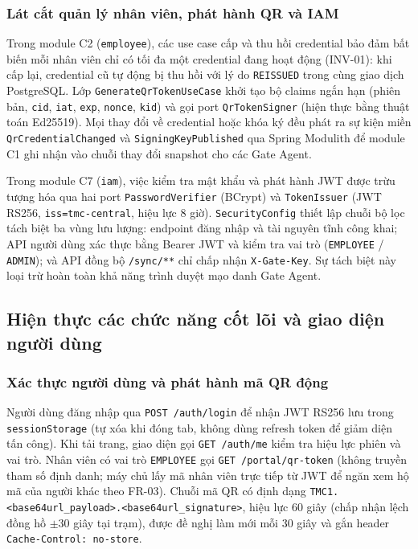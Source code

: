 \subsubsection{Lát cắt quản lý nhân viên, phát hành QR và IAM}

Trong module C2 (\texttt{employee}), các use case cấp và thu hồi credential bảo đảm bất biến mỗi nhân
viên chỉ có tối đa một credential đang hoạt động (INV-01): khi cấp lại, credential cũ tự động bị thu
hồi với lý do \texttt{REISSUED} trong cùng giao dịch PostgreSQL. Lớp
\texttt{GenerateQrTokenUseCase} khởi tạo bộ claims ngắn hạn (phiên bản, \texttt{cid}, \texttt{iat},
\texttt{exp}, \texttt{nonce}, \texttt{kid}) và gọi port \texttt{QrTokenSigner} (hiện thực bằng thuật
toán Ed25519). Mọi thay đổi về credential hoặc khóa ký đều phát ra sự kiện miền
\texttt{QrCredentialChanged} và \texttt{SigningKeyPublished} qua Spring Modulith để module C1 ghi nhận
vào chuỗi thay đổi snapshot cho các Gate Agent.

Trong module C7 (\texttt{iam}), việc kiểm tra mật khẩu và phát hành JWT được trừu tượng hóa qua hai
port \texttt{PasswordVerifier} (BCrypt) và \texttt{TokenIssuer} (JWT RS256, \texttt{iss=tmc-central},
hiệu lực 8 giờ). \texttt{SecurityConfig} thiết lập chuỗi bộ lọc tách biệt ba vùng lưu lượng: endpoint
đăng nhập và tài nguyên tĩnh công khai; API người dùng xác thực bằng Bearer JWT và kiểm tra vai trò
(\texttt{EMPLOYEE} / \texttt{ADMIN}); và API đồng bộ \texttt{/sync/**} chỉ chấp nhận
\texttt{X-Gate-Key}. Sự tách biệt này loại trừ hoàn toàn khả năng trình duyệt mạo danh Gate Agent.

\subsection{Hiện thực các chức năng cốt lõi và giao diện người dùng}\label{sec:core-function-implementation}

\subsubsection{Xác thực người dùng và phát hành mã QR động}

Người dùng đăng nhập qua \texttt{POST /auth/login} để nhận JWT RS256 lưu trong
\texttt{sessionStorage} (tự xóa khi đóng tab, không dùng refresh token để giảm diện tấn công). Khi
tải trang, giao diện gọi \texttt{GET /auth/me} kiểm tra hiệu lực phiên và vai trò. Nhân viên có vai
trò \texttt{EMPLOYEE} gọi \texttt{GET /portal/qr-token} (không truyền tham số định danh; máy chủ lấy
mã nhân viên trực tiếp từ JWT để ngăn xem hộ mã của người khác theo FR-03). Chuỗi mã QR có định dạng
\texttt{TMC1.<base64url\_payload>.<base64url\_signature>}, hiệu lực 60 giây (chấp nhận lệch đồng hồ
$\pm 30$ giây tại trạm), được đề nghị làm mới mỗi 30 giây và gắn header
\texttt{Cache-Control: no-store}.

